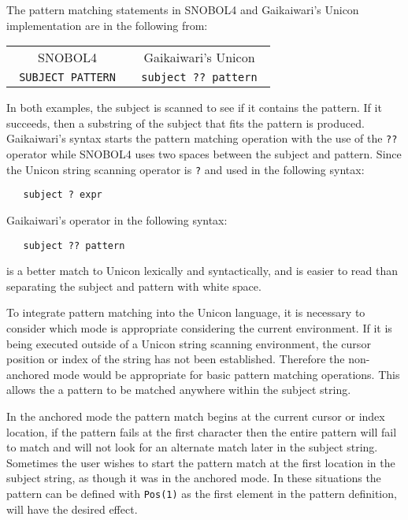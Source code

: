 \documentclass{article}
\begin{document}
The pattern matching statements in SNOBOL4 and Gaikaiwari's Unicon implementation are in the following from:\\

\begin{table}[ht]
	\centering
	\begin{tabular}{c c}
		SNOBOL4 & Gaikaiwari's Unicon \\
		\texttt{ SUBJECT  PATTERN }& 
		
		\texttt{ subject ?? pattern }

	\end{tabular}
\end{table}
\noindent
In both examples, the subject is scanned to see if it contains the pattern.  If it succeeds, then a substring of the subject that fits the pattern is produced.  Gaikaiwari's syntax starts the pattern matching operation with the use of the \texttt{??} operator while SNOBOL4 uses two spaces between the subject and pattern.  Since the Unicon string scanning operator is \texttt{?} and used in the following syntax:
\begin{verbatim}
   subject ? expr
\end{verbatim}
Gaikaiwari's operator in the following syntax:
\begin{verbatim}
   subject ?? pattern
\end{verbatim}
is a better match to Unicon lexically and syntactically, and is easier to read than separating the subject and pattern with white space.   

To integrate pattern matching into the Unicon language, it is necessary to consider which mode is appropriate considering the current environment.  If it is being executed outside of a Unicon string scanning environment, the cursor position or index of the string has not been established.  Therefore the non-anchored mode would be appropriate for basic pattern matching operations.  This allows the a pattern to be matched anywhere within the subject string.  

In the anchored mode the pattern match begins at the current cursor or index location, if the pattern fails at the first character then the entire pattern will fail to match and will not look for an alternate match later in the subject string.  Sometimes the user wishes to start the pattern match at the first location in the subject string, as though it was in the anchored mode.  In these situations the pattern can be defined with \texttt{Pos(1)} as the first element in the pattern definition, will have the desired effect.
\end{document}
